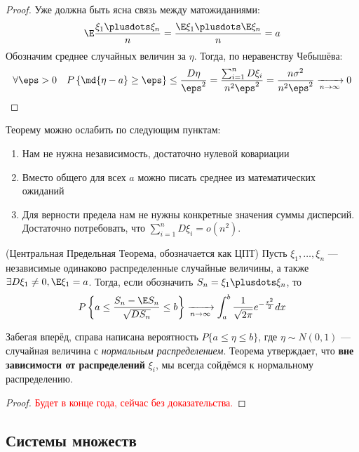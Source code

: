 \begin{proof}
	Уже должна быть ясна связь между матожиданиями:
	\[
		\E \frac{\xi_1 \plusdots \xi_n}{n} = \frac{\E\xi_1 \plusdots \E\xi_n}{n} = a
	\]
	Обозначим среднее случайных величин за $\eta$. Тогда, по неравенству Чебышёва:
	\[
		\forall \eps > 0 \quad P\left\{\md{\eta - a} \ge \eps\right\} \le \frac{D\eta}{\eps^2} = \frac{\sum_{i = 1}^n D\xi_i}{n^2 \eps^2} = \frac{n\sigma^2}{n^2 \eps^2} \xrightarrow[n \to \infty]{} 0
	\]
\end{proof}

\begin{note}
	Теорему можно ослабить по следующим пунктам:
	\begin{enumerate}
		\item Нам не нужна независимость, достаточно нулевой ковариации
		
		\item Вместо общего для всех $a$ можно писать среднее из математических ожиданий
		
		\item Для верности предела нам не нужны конкретные значения суммы дисперсий. Достаточно потребовать, что $\sum_{i = 1}^n D\xi_i = o(n^2)$. 
	\end{enumerate}
\end{note}

\begin{theorem} (Центральная Предельная Теорема, обозначается как ЦПТ)
	Пусть $\xi_1, \ldots, \xi_n$ --- независимые одинаково распределенные случайные величины, а также $\exists D\xi_1 \neq 0, \E\xi_1 = a$. Тогда, если обозначить $S_n = \xi_1 \plusdots \xi_n$, то
	\[
		P\left\{a \le \frac{S_n - \E S_n}{\sqrt{DS_n}} \le b\right\} \xrightarrow[n \to \infty]{} \int_a^b \frac{1}{\sqrt{2\pi}} e^{-\frac{x^2}{2}}dx
	\]
\end{theorem}

\begin{note}
	Забегая вперёд, справа написана вероятность $P\{a \le \eta \le b\}$, где $\eta \sim N(0, 1)$ --- случайная величина с \textit{нормальным распределением}. Теорема утверждает, что \textbf{вне зависимости от распределений} $\xi_i$, мы всегда сойдёмся к нормальному распределению.
\end{note}

\begin{proof}
	\textcolor{red}{Будет в конце года, сейчас без доказательства.}
\end{proof}

\subsection{Системы множеств}

